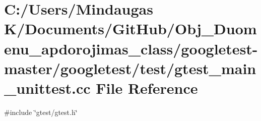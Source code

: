 \hypertarget{googletest-master_2googletest_2test_2gtest__main__unittest_8cc}{}\section{C\+:/\+Users/\+Mindaugas K/\+Documents/\+Git\+Hub/\+Obj\+\_\+\+Duomenu\+\_\+apdorojimas\+\_\+class/googletest-\/master/googletest/test/gtest\+\_\+main\+\_\+unittest.cc File Reference}
\label{googletest-master_2googletest_2test_2gtest__main__unittest_8cc}
{\ttfamily \#include \char`\"{}gtest/gtest.\+h\char`\"{}}\newline
